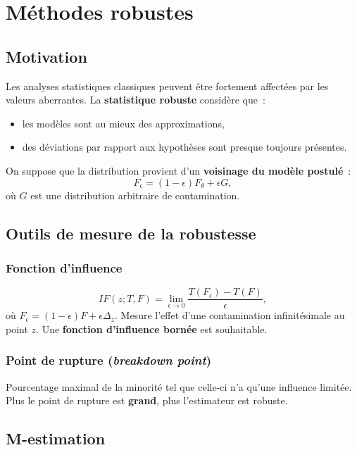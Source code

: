 \documentclass[11pt,letterpaper]{article}
\begin{document}
\newpage
\section{Méthodes robustes}

\subsection{Motivation}

Les analyses statistiques classiques peuvent être fortement affectées par les valeurs aberrantes. La \textbf{statistique robuste} considère que~:
\begin{itemize}
\item les modèles sont au mieux des approximations,
\item des déviations par rapport aux hypothèses sont presque toujours présentes.
\end{itemize}

On suppose que la distribution provient d'un \textbf{voisinage du modèle postulé}~:
$$F_\epsilon = (1-\epsilon)F_\theta + \epsilon G,$$
où $G$ est une distribution arbitraire de contamination.

\subsection{Outils de mesure de la robustesse}

\subsubsection{Fonction d'influence}
$$IF(z; T, F) = \lim_{\epsilon \to 0} \frac{T(F_\epsilon) - T(F)}{\epsilon},$$
où $F_\epsilon = (1-\epsilon)F + \epsilon\Delta_z$. Mesure l'effet d'une contamination infinitésimale au point $z$. Une \textbf{fonction d'influence bornée} est souhaitable.

\subsubsection{Point de rupture (\textit{breakdown point})}
Pourcentage maximal de la minorité tel que celle-ci n'a qu'une influence limitée. Plus le point de rupture est \textbf{grand}, plus l'estimateur est robuste.

\subsection{M-estimation}
\end{document}
